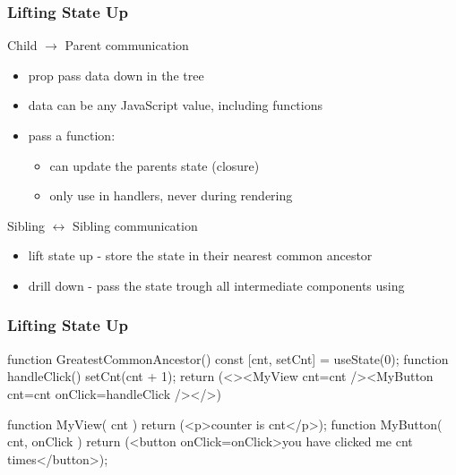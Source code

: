\begin{frame}[fragile] \frametitle{Lifting State Up}
Child $\rightarrow$ Parent communication
\begin{itemize}
  \item prop pass data down in the tree
  \item data can be any JavaScript value, including functions
  \item pass a  function:
  \begin{itemize}
    \item {} can update the parents state (closure)
    \item only use in handlers, never during rendering
  \end{itemize}
\end{itemize}
Sibling $\leftrightarrow$ Sibling communication
\begin{itemize}
  \item lift state up - store the state in their nearest common ancestor
  \item drill down - pass the state trough all intermediate components using 
\end{itemize}
\end{frame}

\begin{frame}[fragile] \frametitle{Lifting State Up}
\begin{CodeBox}{}
function GreatestCommonAncestor() {
  const [cnt, setCnt] = useState(0);
  function handleClick() { setCnt(cnt + 1); }
  return (<><MyView cnt={cnt} /><MyButton cnt={cnt} onClick={handleClick} /></>)
}

function MyView({ cnt }) {
  return (<p>counter is {cnt}</p>);
}
function MyButton({ cnt, onClick }) {
  return (<button onClick={onClick}>you have clicked me {cnt} times</button>);
}
\end{CodeBox}
\end{frame}

